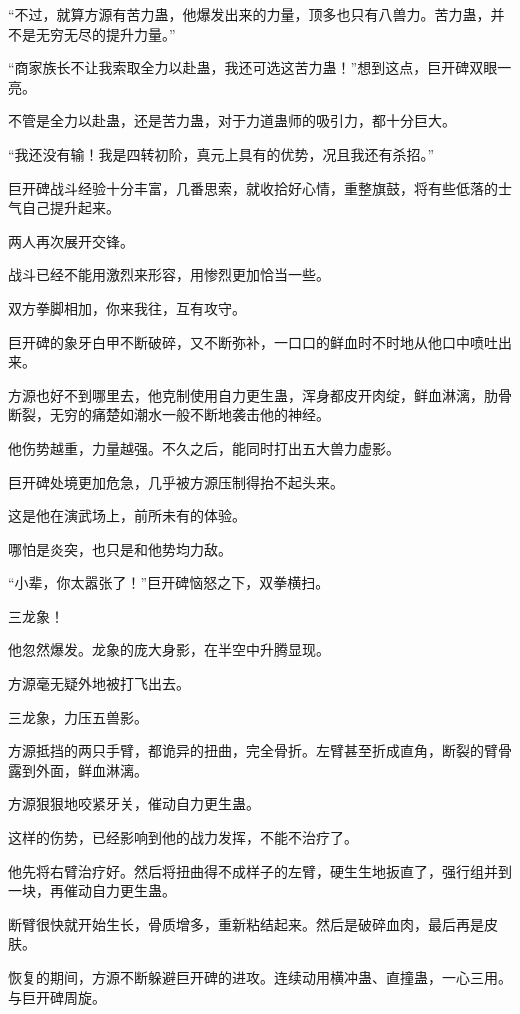 
\begin{this_body}

“不过，就算方源有苦力蛊，他爆发出来的力量，顶多也只有八兽力。苦力蛊，并不是无穷无尽的提升力量。”

“商家族长不让我索取全力以赴蛊，我还可选这苦力蛊！”想到这点，巨开碑双眼一亮。

不管是全力以赴蛊，还是苦力蛊，对于力道蛊师的吸引力，都十分巨大。

“我还没有输！我是四转初阶，真元上具有的优势，况且我还有杀招。”

巨开碑战斗经验十分丰富，几番思索，就收拾好心情，重整旗鼓，将有些低落的士气自己提升起来。

两人再次展开交锋。

战斗已经不能用激烈来形容，用惨烈更加恰当一些。

双方拳脚相加，你来我往，互有攻守。

巨开碑的象牙白甲不断破碎，又不断弥补，一口口的鲜血时不时地从他口中喷吐出来。

方源也好不到哪里去，他克制使用自力更生蛊，浑身都皮开肉绽，鲜血淋漓，肋骨断裂，无穷的痛楚如潮水一般不断地袭击他的神经。

他伤势越重，力量越强。不久之后，能同时打出五大兽力虚影。

巨开碑处境更加危急，几乎被方源压制得抬不起头来。

这是他在演武场上，前所未有的体验。

哪怕是炎突，也只是和他势均力敌。

“小辈，你太嚣张了！”巨开碑恼怒之下，双拳横扫。

三龙象！

他忽然爆发。龙象的庞大身影，在半空中升腾显现。

方源毫无疑外地被打飞出去。

三龙象，力压五兽影。

方源抵挡的两只手臂，都诡异的扭曲，完全骨折。左臂甚至折成直角，断裂的臂骨露到外面，鲜血淋漓。

方源狠狠地咬紧牙关，催动自力更生蛊。

这样的伤势，已经影响到他的战力发挥，不能不治疗了。

他先将右臂治疗好。然后将扭曲得不成样子的左臂，硬生生地扳直了，强行组并到一块，再催动自力更生蛊。

断臂很快就开始生长，骨质增多，重新粘结起来。然后是破碎血肉，最后再是皮肤。

恢复的期间，方源不断躲避巨开碑的进攻。连续动用横冲蛊、直撞蛊，一心三用。与巨开碑周旋。


\end{this_body}
